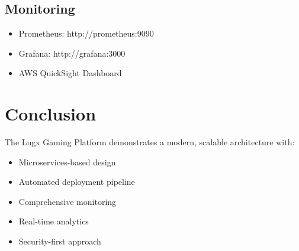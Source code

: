 \documentclass[12pt]{report}
\begin{document}
\section{Monitoring}
\begin{itemize}
    \item Prometheus: http://prometheus:9090
    \item Grafana: http://grafana:3000
    \item AWS QuickSight Dashboard
\end{itemize}

\chapter{Conclusion}
The Lugx Gaming Platform demonstrates a modern, scalable architecture with:
\begin{itemize}
    \item Microservices-based design
    \item Automated deployment pipeline
    \item Comprehensive monitoring
    \item Real-time analytics
    \item Security-first approach
\end{itemize}
\end{document}
